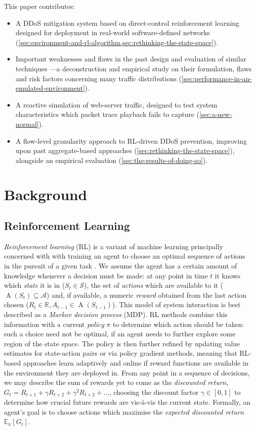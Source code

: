 \documentclass[conference, letterpaper, 10pt, times]{IEEEtran}
\begin{document}
This paper contributes:
\begin{itemize}
	\item A DDoS mitigation system based on direct-control reinforcement learning designed for deployment in real-world software-defined networks (\cref{sec:environment-and-rl-algorithm,sec:rethinking-the-state-space}).
	\item Important weaknesses and flaws in the past design and evaluation of similar techniques \cite{DBLP:journals/eaai/MalialisK15}---a deconstruction and empirical study on their formulation, flaws and risk factors concerning many traffic distributions (\cref{sec:performance-in-an-emulated-environment}).
	\item A reactive simulation of web-server traffic, designed to test system characteristics which packet trace playback fails to capture (\cref{sec:a-new-normal}).
	\item A flow-level granularity approach to RL-driven DDoS prevention, improving upon past aggregate-based approaches (\cref{sec:rethinking-the-state-space}), alongside an empirical evaluation (\cref{sec:the-results-of-doing-so}).
\end{itemize}

\section{Background}
\subsection{Reinforcement Learning}
\emph{Reinforcement learning} (RL) is a variant of machine learning principally concerned with with training an agent to choose an optimal sequence of actions in the pursuit of a given task \cite{RL2E}.
We assume the agent has a certain amount of knowledge whenever a decision must be made: at any point in time $t$ it knows which \emph{state} it is in ($S_t \in \mathcal{S}$), the set of \emph{actions} which are available to it ($\operatorname{A}(S_t) \subseteq \mathcal{A}$) and, if available, a numeric \emph{reward} obtained from the last action chosen ($R_t \in \mathbb{R}, A_{t-1} \in \operatorname{A}(S_{t-1})$).
This model of system interaction is best described as a \emph{Markov decision process} (MDP).
RL methods combine this information with a current \emph{policy} $\pi$ to determine which action should be taken: such a choice need not be optimal, if an agent needs to further explore some region of the state space.
The policy is then further refined by updating value estimates for state-action pairs or via policy gradient methods, meaning that RL-based approaches learn adaptively and online if reward functions are available in the environment they are deployed in.
From any point in a sequence of decisions, we may describe the sum of rewards yet to come as the \emph{discounted return}, $G_t = R_{t+1} + \gamma R_{t+2} + \gamma^2 R_{t+2} + \ldots$, choosing the discount factor $\gamma \in [0,1]$ to determine how crucial future rewards are vis-\`{a}-vis the current state.
Formally, an agent's goal is to choose actions which maximise the \emph{expected discounted return} $\operatorname{\mathbb{E}_{\pi}}[G_t]$.
\end{document}
